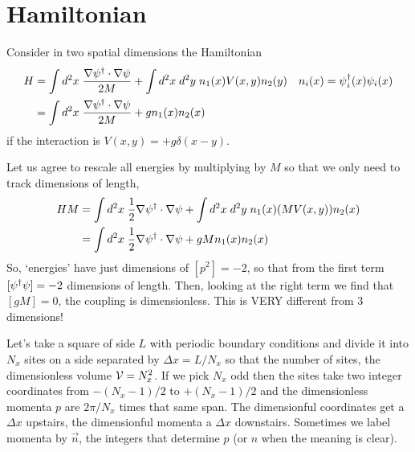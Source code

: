 \section{Hamiltonian}\label{sec:hamiltonian}

Consider in two spatial dimensions the Hamiltonian
\begin{align}
	H
	&= \int d^2x\; \frac{\nabla \psi{}^{\dagger} \cdot \nabla \psi}{2M} + \int d^2x\; d^2y\; n_1(x) V(x,y) n_2(y)
	&
	n_i(x) &= \psi{}^{\dagger}_i(x) \psi_i(x)
	\\
	&= \int d^2x\; \frac{\nabla \psi{}^{\dagger} \cdot \nabla \psi}{2M} + g n_1(x) n_2(x)
\end{align}
if the interaction is $V(x,y) = +g \delta(x-y)$.

Let us agree to rescale all energies by multiplying by $M$ so that we only need to track dimensions of length,
\begin{align}
	HM
	&= \int d^2x\; \frac{1}{2} \nabla \psi{}^{\dagger} \cdot \nabla \psi + \int d^2x\; d^2y\; n_1(x) (MV(x,y)) n_2(x)
	\\
	&= \int d^2x\; \frac{1}{2} \nabla \psi{}^{\dagger} \cdot \nabla \psi + gM n_1(x) n_2(x)
\end{align}
So, `energies' have just dimensions of $[p^2] = -2$, so that from the first term $[\psi{}^{\dagger}\psi] = -2$ dimensions of length.
Then, looking at the right term we find that $[gM] = 0$, the coupling is dimensionless.
This is VERY different from 3 dimensions!

Let's take a square of side $L$ with periodic boundary conditions and divide it into $N_x$ sites on a side separated by $\Delta x = L/N_x$ so that the number of sites, the dimensionless volume $\mathcal{V}=N_x^2$.
If we pick $N_x$ odd then the sites take two integer coordinates from $-(N_x-1)/2$ to $+(N_x-1)/2$ and the dimensionless momenta $p$ are $2\pi / N_x$ times that same span.
The dimensionful coordinates get a $\Delta x$ upstairs, the dimensionful momenta a $\Delta x$ downstairs.
Sometimes we label momenta by $\vec{n}$, the integers that determine $p$ (or $n$ when the meaning is clear).

